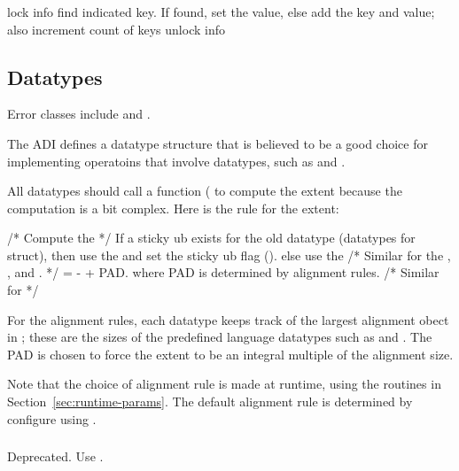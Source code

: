 \documentclass{article}
\begin{document}
\subsubsection{}
\begin{algorithm}
lock info
find indicated key.  
If found, set the value,
else add the key and value; also increment count of keys
unlock info
\end{algorithm}


\subsection{Datatypes}
\label{sec:datatypes}

Error classes include  and
. 

The ADI defines a datatype structure that is believed to be a good
choice for implementing operatoins that involve datatypes, such as
 and .

All datatypes should call a function
( to compute the extent because the
computation is a bit complex.  Here is the rule for the extent:
\begin{algorithm}
/* Compute the  */
If a sticky ub exists for the old datatype (datatypes for struct), then
    use the  and set the sticky ub flag
    ().
else
    use the 
/* Similar for the ,
   ,
      and
   . */
 =  -  + PAD.
where PAD is determined by alignment rules.  
/* Similar for  */

For the alignment rules, each datatype keeps track of the largest
alignment obect in ; these are the
sizes of the predefined language datatypes such as  and
.  The PAD is chosen to force the extent to be an integral
multiple of the alignment size.
\end{algorithm}
Note that the choice of alignment rule is made at runtime, using the
routines in Section~\ref{sec:runtime-params}.  The default alignment
rule is determined by configure using .

\subsubsection{}
Deprecated.  Use .
\end{document}
